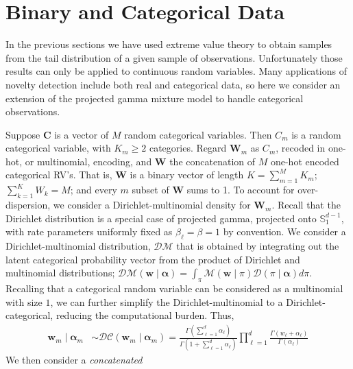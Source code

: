 \section{Binary and Categorical Data\label{sec:categorical}}
In the previous sections we have used extreme value theory to obtain samples
    from the tail distribution of a given sample of observations. Unfortunately 
    those results can only be applied to continuous random variables.  Many 
    applications of novelty detection include both real and categorical 
    data, so here we consider an extension of the projected gamma mixture model 
    to handle categorical observations. 

Suppose $\bm{C}$ is a vector of $M$ random categorical variables.  Then $C_m$ 
    is a random categorical variable, with $K_{m} \geq 2$ categories. Regard 
    $\bm{W}_m$ as $C_m$, recoded in one-hot, or multinomial, encoding, and 
    $\bm{W}$ the concatenation of $M$ one-hot encoded categorical RV's. That is, 
    $\bm{W}$ is a binary vector of length $K = \sum_{m = 1}^M K_{m}$; 
    $\sum_{k = 1}^K W_k = M$; and every $m$ subset of $\bm{W}$ sums to 1.
    To account for over-dispersion, we consider a Dirichlet-multinomial 
    density for $\bm{W}_m$. Recall that the Dirichlet distribution is a 
    special case of projected gamma, projected onto $\mathbb{S}_1^{d-1}$, 
    with rate parameters uniformly fixed as $\beta_{\ell} = \beta = 1$ 
    by convention.  We consider a Dirichlet-multinomial distribution, $\mathcal{DM}$
    that is obtained by integrating out the latent categorical probability vector 
    from the product of Dirichlet and multinomial distributions; 
    $\mathcal{DM}(\bm{w}\mid\bm{\alpha}) = \int_{\pi}\mathcal{M}(\bm{w}\mid\pi)\mathcal{D}(\pi\mid\bm{\alpha})d\pi$.
    Recalling that a categorical random variable can be considered as a multinomial with 
    size $1$, we can further simplify the Dirichlet-multinomial to a 
    Dirichlet-categorical, reducing the computational burden. Thus,
    \begin{equation}
        \begin{aligned}
        \label{eqn:dirmultinom}
        \bm{w}_{m}\mid\bm{\alpha}_m 
        &\sim 
        \mathcal{DC}(\bm{w}_m\mid\bm{\alpha}_m) = 
        \frac{\Gamma(\sum_{\ell=1}^d \alpha_{\ell})}{\Gamma(1 + \sum_{\ell = 1}^d\alpha_{\ell})}
        \prod_{\ell = 1}^d \frac{\Gamma(w_{\ell} + \alpha_{\ell})}{\Gamma(\alpha_{\ell})}
        \end{aligned}
    \end{equation}
    We then consider a \emph{concatenated} 
